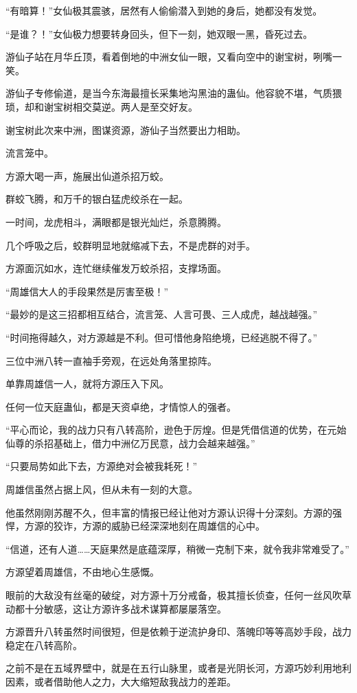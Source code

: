 \begin{this_body}
“有暗算！”女仙极其震骇，居然有人偷偷潜入到她的身后，她都没有发觉。

“是谁？！”女仙极力想要转身回头，但下一刻，她双眼一黑，昏死过去。

游仙子站在月华丘顶，看着倒地的中洲女仙一眼，又看向空中的谢宝树，咧嘴一笑。

游仙子专修偷道，是当今东海最擅长采集地沟黑油的蛊仙。他容貌不堪，气质猥琐，却和谢宝树相交莫逆。两人是至交好友。

谢宝树此次来中洲，图谋资源，游仙子当然要出力相助。

流言笼中。

方源大喝一声，施展出仙道杀招万蛟。

群蛟飞腾，和万千的银白猛虎绞杀在一起。

一时间，龙虎相斗，满眼都是银光灿烂，杀意腾腾。

几个呼吸之后，蛟群明显地就缩减下去，不是虎群的对手。

方源面沉如水，连忙继续催发万蛟杀招，支撑场面。

“周雄信大人的手段果然是厉害至极！”

“最妙的是这三招都相互结合，流言笼、人言可畏、三人成虎，越战越强。”

“时间拖得越久，对方源越是不利。但可惜他身陷绝境，已经逃脱不得了。”

三位中洲八转一直袖手旁观，在远处角落里掠阵。

单靠周雄信一人，就将方源压入下风。

任何一位天庭蛊仙，都是天资卓绝，才情惊人的强者。

“平心而论，我的战力只有八转高阶，逊色于厉煌。但是凭借信道的优势，在元始仙尊的杀招基础上，借力中洲亿万民意，战力会越来越强。”

“只要局势如此下去，方源绝对会被我耗死！”

周雄信虽然占据上风，但从未有一刻的大意。

他虽然刚刚苏醒不久，但丰富的情报已经让他对方源认识得十分深刻。方源的强悍，方源的狡诈，方源的威胁已经深深地刻在周雄信的心中。

“信道，还有人道……天庭果然是底蕴深厚，稍微一克制下来，就令我非常难受了。”

方源望着周雄信，不由地心生感慨。

眼前的大敌没有丝毫的破绽，对方源十万分戒备，极其擅长侦查，任何一丝风吹草动都十分敏感，这让方源许多战术谋算都屡屡落空。

方源晋升八转虽然时间很短，但是依赖于逆流护身印、落魄印等等高妙手段，战力稳定在八转高阶。

之前不是在五域界壁中，就是在五行山脉里，或者是光阴长河，方源巧妙利用地利因素，或者借助他人之力，大大缩短敌我战力的差距。


\end{this_body}
